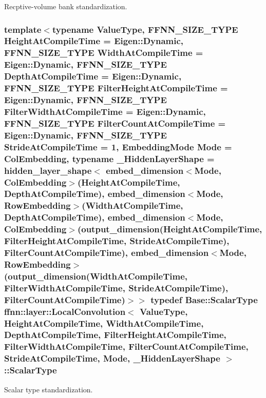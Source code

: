 Recptive-\/volume bank standardization. 

\hypertarget{classffnn_1_1layer_1_1_local_convolution_a45fb8729213ea0bc40845cc1161fe229}{
\subsubsection[{Scalar\-Type}]{\setlength{\rightskip}{0pt plus 5cm}template$<$typename Value\-Type, F\-F\-N\-N\-\_\-\-S\-I\-Z\-E\-\_\-\-T\-Y\-P\-E Height\-At\-Compile\-Time = Eigen\-::\-Dynamic, F\-F\-N\-N\-\_\-\-S\-I\-Z\-E\-\_\-\-T\-Y\-P\-E Width\-At\-Compile\-Time = Eigen\-::\-Dynamic, F\-F\-N\-N\-\_\-\-S\-I\-Z\-E\-\_\-\-T\-Y\-P\-E Depth\-At\-Compile\-Time = Eigen\-::\-Dynamic, F\-F\-N\-N\-\_\-\-S\-I\-Z\-E\-\_\-\-T\-Y\-P\-E Filter\-Height\-At\-Compile\-Time = Eigen\-::\-Dynamic, F\-F\-N\-N\-\_\-\-S\-I\-Z\-E\-\_\-\-T\-Y\-P\-E Filter\-Width\-At\-Compile\-Time = Eigen\-::\-Dynamic, F\-F\-N\-N\-\_\-\-S\-I\-Z\-E\-\_\-\-T\-Y\-P\-E Filter\-Count\-At\-Compile\-Time = Eigen\-::\-Dynamic, F\-F\-N\-N\-\_\-\-S\-I\-Z\-E\-\_\-\-T\-Y\-P\-E Stride\-At\-Compile\-Time = 1, Embedding\-Mode Mode = Col\-Embedding, typename \-\_\-\-Hidden\-Layer\-Shape = hidden\-\_\-layer\-\_\-shape$<$              embed\-\_\-dimension$<$\-Mode, Col\-Embedding$>$(\-Height\-At\-Compile\-Time, Depth\-At\-Compile\-Time),              embed\-\_\-dimension$<$\-Mode, Row\-Embedding$>$(\-Width\-At\-Compile\-Time,  Depth\-At\-Compile\-Time),              embed\-\_\-dimension$<$\-Mode, Col\-Embedding$>$(output\-\_\-dimension(\-Height\-At\-Compile\-Time, Filter\-Height\-At\-Compile\-Time, Stride\-At\-Compile\-Time), Filter\-Count\-At\-Compile\-Time),              embed\-\_\-dimension$<$\-Mode, Row\-Embedding$>$(output\-\_\-dimension(\-Width\-At\-Compile\-Time,  Filter\-Width\-At\-Compile\-Time,  Stride\-At\-Compile\-Time), Filter\-Count\-At\-Compile\-Time)$>$$>$ typedef {\bf Base\-::\-Scalar\-Type} {\bf ffnn\-::layer\-::\-Local\-Convolution}$<$ Value\-Type, Height\-At\-Compile\-Time, Width\-At\-Compile\-Time, Depth\-At\-Compile\-Time, Filter\-Height\-At\-Compile\-Time, Filter\-Width\-At\-Compile\-Time, Filter\-Count\-At\-Compile\-Time, Stride\-At\-Compile\-Time, Mode, \-\_\-\-Hidden\-Layer\-Shape $>$\-::{\bf Scalar\-Type}}}\label{classffnn_1_1layer_1_1_local_convolution_a45fb8729213ea0bc40845cc1161fe229}


Scalar type standardization. 

